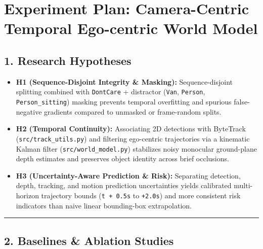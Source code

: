 \documentclass[10.5pt,a4paper]{article}
\begin{document}
\newpage
\section{Experiment Plan: Camera-Centric Temporal Ego-centric World Model}

\subsection{1. Research Hypotheses}

\begin{itemize}[leftmargin=1.5em,itemsep=2pt]
\item \textbf{H1 (Sequence-Disjoint Integrity \& Masking):} Sequence-disjoint splitting combined with \texttt{DontCare} + distractor (\texttt{Van}, \texttt{Person}, \texttt{Person\_\allowbreak{}sitting}) masking prevents temporal overfitting and spurious false-negative gradients compared to unmasked or frame-random splits.
\item \textbf{H2 (Temporal Continuity):} Associating 2D detections with ByteTrack (\texttt{src/\allowbreak{}track\_\allowbreak{}utils.\allowbreak{}py}) and filtering ego-centric trajectories via a kinematic Kalman filter (\texttt{src/\allowbreak{}world\_\allowbreak{}model.\allowbreak{}py}) stabilizes noisy monocular ground-plane depth estimates and preserves object identity across brief occlusions.
\item \textbf{H3 (Uncertainty-Aware Prediction \& Risk):} Separating detection, depth, tracking, and motion prediction uncertainties yields calibrated multi-horizon trajectory bounds (\texttt{t + 0.\allowbreak{}5s} to \texttt{+2.\allowbreak{}0s}) and more consistent risk indicators than naive linear bounding-box extrapolation.
\end{itemize}

\par\noindent\rule{\textwidth}{0.4pt}\par\medskip

\subsection{2. Baselines \& Ablation Studies}
\end{document}
